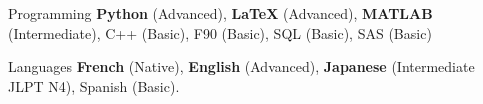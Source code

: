 

\begin{cvskills}

\cvskill
  {Programming} %
  {\textbf{Python} (Advanced), \textbf{LaTeX} (Advanced), \textbf{MATLAB} (Intermediate), {C++} (Basic), F90 (Basic), SQL (Basic), SAS (Basic)} %

\cvskill
  {Languages} %
  {\textbf{French} (Native), \textbf{English} (Advanced), \textbf{Japanese} (Intermediate JLPT N4), Spanish (Basic).} %

\end{cvskills}
